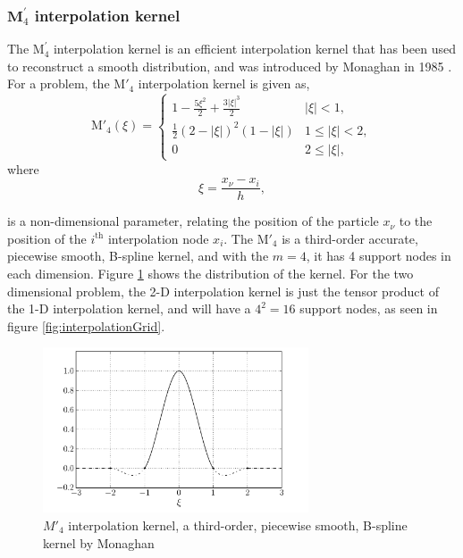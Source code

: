 \subsubsection*{$\mathbf{M}^\prime_4$ interpolation kernel}

The $\mathrm{M}^{\prime}_4$ interpolation kernel is an efficient interpolation kernel that has been used to reconstruct a smooth distribution, and was introduced by Monaghan in 1985 \cite{Monaghan1985}. For a  problem, the $\mathrm{M}'_4$ interpolation kernel is given as,
	\begin{equation}
	{\mathrm{M'}_4}\left( {\xi} \right) =
	  \begin{cases}
	   {1 - \frac{{5{\xi ^2}}}{2} + \frac{{3{{\left| \xi  \right|}^3}}}{2}} & {\left| \xi \right|} < 1, \\
	   \frac{1}{2}{\left( {2 - \left| \xi  \right|} \right)^2}\left( {1 - \left| \xi  \right|} \right) & 1 \leqslant {\left| \xi \right|} < 2,\\
	   0 & 2 \leqslant \left| \xi \right|,
	  \end{cases}
	\label{eq:interpKernel}
	\end{equation}
where
	\begin{equation}
	\xi = \frac{x_{\nu} - x_i}{h},
	\label{eq:xiEquation}
	\end{equation}
	
is a non-dimensional parameter, relating the position of the particle $x_{\nu}$ to the position of the $i^{\mathrm{th}}$ interpolation node $x_i$. The $\mathrm{M'}_4$ is a third-order accurate, piecewise smooth, B-spline kernel, and with the $m = 4$, it has 4 support nodes in each dimension. Figure \ref{fig:interpolationKernel} shows the distribution of the kernel. For the two dimensional problem, the 2-D interpolation kernel is just the tensor product of the 1-D interpolation kernel, and will have a $4^2 = 16$ support nodes, as seen in figure \ref{fig:interpolationGrid}.

	\begin{figure}[t]
	\centering
	\includegraphics[width=0.7\textwidth]{figures/lagrangian/interpolationKernel.pdf}
	\caption{$M'_4$ interpolation kernel, a third-order, piecewise smooth, B-spline kernel by Monaghan \cite{Monaghan1985}}
	\label{fig:interpolationKernel}
	\end{figure}

